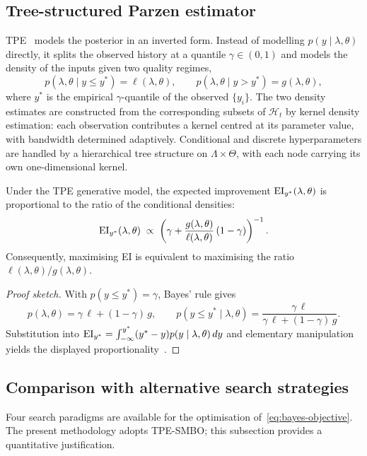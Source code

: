 \subsection{Tree-structured Parzen estimator}
\label{subsubsec:tpe}

TPE~\parencite{bergstra2011algorithms} models the posterior in an inverted form. Instead of modelling $p(y\mid\lambda,\theta)$ directly, it splits the observed history at a quantile $\gamma\in(0,1)$ and models the density of the inputs given two quality regimes,
\[
  p(\lambda,\theta\mid y\leq y^*)=\ell(\lambda,\theta),
  \qquad
  p(\lambda,\theta\mid y>y^*)=g(\lambda,\theta),
\]
where $y^*$ is the empirical $\gamma$-quantile of the observed $\{y_i\}$. The two density estimates are constructed from the corresponding subsets of $\mathcal{H}_t$ by kernel density estimation: each observation contributes a kernel centred at its parameter value, with bandwidth determined adaptively. Conditional and discrete hyperparameters are handled by a hierarchical tree structure on $\Lambda\times\Theta$, with each node carrying its own one-dimensional kernel.

\begin{proposition}
\label{prop:tpe-ratio}
Under the TPE generative model, the expected improvement $\operatorname{EI}_{y^*}(\lambda,\theta)$ is proportional to the ratio of the conditional densities:
\[
  \operatorname{EI}_{y^*}(\lambda,\theta)\;\propto\;\left(\gamma+\frac{g(\lambda,\theta)}{\ell(\lambda,\theta)}\,(1-\gamma)\right)^{-1}.
\]
Consequently, maximising EI is equivalent to maximising the ratio $\ell(\lambda,\theta)/g(\lambda,\theta)$.
\end{proposition}

\begin{proof}[Proof sketch]
With $p(y\leq y^*)=\gamma$, Bayes' rule gives
\[
  p(\lambda,\theta)=\gamma\,\ell+(1-\gamma)\,g,
  \qquad
  p(y\leq y^*\mid\lambda,\theta)=\frac{\gamma\,\ell}{\gamma\,\ell+(1-\gamma)\,g}.
\]
Substitution into $\operatorname{EI}_{y^*}=\int_{-\infty}^{y^*}(y^*-y)p(y\mid\lambda,\theta)\,dy$ and elementary manipulation yields the displayed proportionality~\parencite{bergstra2011algorithms}.
\end{proof}

\subsection{Comparison with alternative search strategies}
\label{subsubsec:alternatives}

Four search paradigms are available for the optimisation of~\eqref{eq:bayes-objective}. The
present methodology adopts TPE-SMBO; this subsection provides a quantitative justification.

